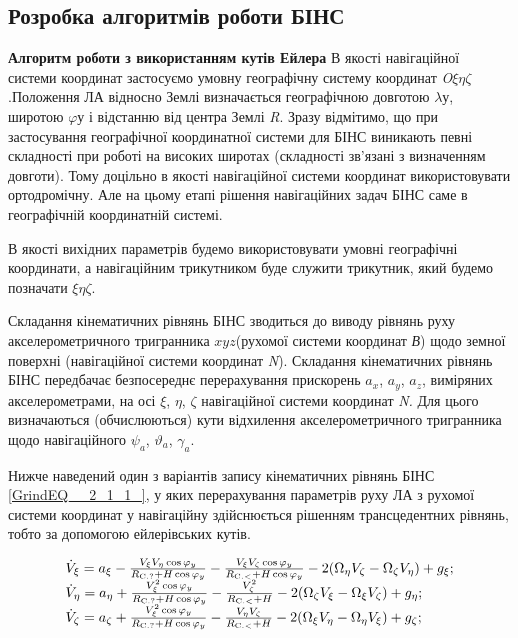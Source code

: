 
\subsection{Розробка алгоритмів роботи БІНС}

\textbf{Алгоритм роботи з використанням кутів Ейлера}
В якості навігаційної системи координат застосуємо умовну географічну систему координат \textit{O}$\xi$$\eta$$\zeta$.Положення 
ЛА відносно Землі визначається географічною довготою $\lambda$у, широтою $\varphi$у 
і відстанню від центра Землі \textit{R}. Зразу відмітимо, що при застосування географічної 
координатної системи для БІНС виникають певні складності при роботі на високих широтах 
(складності зв'язані з визначенням довготи). Тому доцільно в якості навігаційної 
системи координат використовувати ортодромічну. Але на цьому етапі рішення навігаційних 
задач БІНС саме в географічній координатній системі.   

В якості вихідних параметрів будемо використовувати умовні географічні координати, 
а навігаційним трикутником буде служити трикутник, який будемо позначати $\xi$$\eta$$\zeta$.

Складання кінематичних рівнянь БІНС зводиться до виводу рівнянь руху акселерометричного тригранника $xyz$(рухомої 
системи координат \textit{В}) щодо земної поверхні (навігаційної   системи координат \textit{N}). 
Складання кінематичних рівнянь БІНС передбачає безпосереднє перерахування прискорень $a_{x} $, $a_{y} $, $a_{z} $,  
виміряних акселерометрами, на осі $\xi $, $\eta $, $\zeta $ навігаційної   системи 
координат \textit{N. }Для цього визначаються (обчислюються) кути відхилення акселерометричного 
тригранника щодо навігаційного $\psi_{a} $, $\vartheta_{a} $,  $\gamma_{a} $.

Нижче наведений один з варіантів запису кінематичних рівнянь БІНС \eqref{GrindEQ__2_1_1_}, 
у яких перерахування параметрів руху ЛА з рухомої системи координат у навігаційну 
здійснюється рішенням трансцедентних рівнянь, тобто за допомогою ейлерівських кутів.  



\[\begin{array}{l} 
{\dot{V}_{\xi } =a_{\xi } -\frac{V_{\xi } V_{\eta } \cos \varphi_{y} }{R_{{\rm C.?}} 
+H\cos \varphi_{y} } -\frac{V_{\xi } V_{\zeta } \cos \varphi_{y} }{R_{{\rm C.<}} 
+H\cos \varphi_{y} } -2(\Omega_{\eta } V_{\zeta } -\Omega_{\zeta } V_{\eta } )+g_{
\xi } ;} \\ {\dot{V}_{\eta } =a_{\eta } +\frac{V_{\xi }^{2} \cos \varphi_{y} }{R_{{
\rm C.?}} +H\cos \varphi_{y} } -\frac{V_{\zeta }^{2} }{R_{{\rm C.<}} +H} -2(\Omega 
_{\zeta } V_{\xi } -\Omega_{\xi } V_{\zeta } )+g_{\eta } ;} \\ {\dot{V}_{\zeta } 
=a_{\zeta } +\frac{V_{\xi }^{2} \cos \varphi_{y} }{R_{{\rm C.?}} +H\cos \varphi 
_{y} } -\frac{V_{\eta } V_{\zeta } }{R_{{\rm C.<}} +H} -2(\Omega_{\xi } V_{\eta 
} -\Omega_{\eta } V_{\xi } )+g_{\zeta } ;} \end{array}\] 

